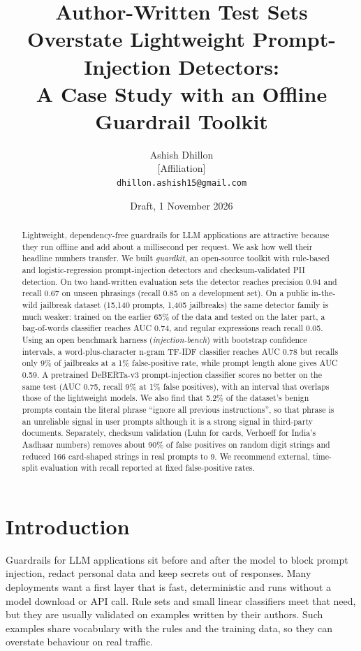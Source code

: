 \documentclass[11pt]{article}
\title{Author-Written Test Sets Overstate Lightweight Prompt-Injection Detectors:\\A Case Study with an Offline Guardrail Toolkit}
\author{Ashish Dhillon\\\small [Affiliation]\\\small \texttt{dhillon.ashish15@gmail.com}}
\date{Draft, 1 November 2026}
\begin{document}
\maketitle

\begin{abstract}
Lightweight, dependency-free guardrails for LLM applications are attractive because they run offline and add about a millisecond per request. We ask how well their headline numbers transfer. We built \emph{guardkit}, an open-source toolkit with rule-based and logistic-regression prompt-injection detectors and checksum-validated PII detection. On two hand-written evaluation sets the detector reaches precision 0.94 and recall 0.67 on unseen phrasings (recall 0.85 on a development set). On a public in-the-wild jailbreak dataset (15,140 prompts, 1,405 jailbreaks) the same detector family is much weaker: trained on the earlier 65\% of the data and tested on the later part, a bag-of-words classifier reaches AUC 0.74, and regular expressions reach recall 0.05. Using an open benchmark harness (\emph{injection-bench}) with bootstrap confidence intervals, a word-plus-character n-gram TF-IDF classifier reaches AUC 0.78 but recalls only 9\% of jailbreaks at a 1\% false-positive rate, while prompt length alone gives AUC 0.59. A pretrained DeBERTa-v3 prompt-injection classifier scores no better on the same test (AUC 0.75, recall 9\% at 1\% false positives), with an interval that overlaps those of the lightweight models. We also find that 5.2\% of the dataset's benign prompts contain the literal phrase ``ignore all previous instructions'', so that phrase is an unreliable signal in user prompts although it is a strong signal in third-party documents. Separately, checksum validation (Luhn for cards, Verhoeff for India's Aadhaar numbers) removes about 90\% of false positives on random digit strings and reduced 166 card-shaped strings in real prompts to 9. We recommend external, time-split evaluation with recall reported at fixed false-positive rates.
\end{abstract}

\section{Introduction}
Guardrails for LLM applications sit before and after the model to block prompt injection, redact personal data and keep secrets out of responses. Many deployments want a first layer that is fast, deterministic and runs without a model download or API call. Rule sets and small linear classifiers meet that need, but they are usually validated on examples written by their authors. Such examples share vocabulary with the rules and the training data, so they can overstate behaviour on real traffic.
\end{document}
